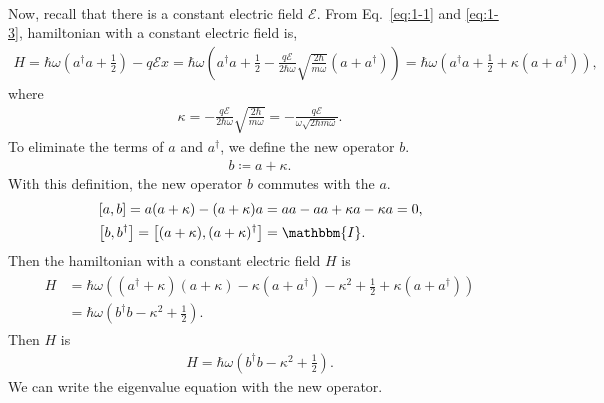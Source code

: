 \documentclass[floatfix,nofootinbib,superscriptaddress,fleqn]{revtex4-2}
\begin{document}
\begin{itemize}
\begin{align}
  \end{align}
  Now, recall that there is a constant 
  electric field $\mathcal{E}$. 
  From Eq.~\eqref{eq:1-1} and \eqref{eq:1-3}, 
  hamiltonian with a constant electric field is,
   \begin{align}\label{eq:1-4}
    H = \hbar\omega\left(a^\dagger a 
    + \frac{1}{2}\right)-q\mathcal{E}x
    = \hbar\omega\left(a^\dagger a 
    + \frac{1}{2}-\frac{q\mathcal{E}}{2\hbar\omega}
    \sqrt{\frac{2\hbar}{m\omega}}
    \left(a+a^\dagger\right)\right)
    =\hbar\omega\left(a^\dagger a 
    + \frac{1}{2}+\kappa\left(a+a^\dagger\right)\right),
   \end{align}  
   where
  \begin{align}\label{eq:1-8}
   \kappa = -\frac{q\mathcal{E}}{2\hbar\omega}
   \sqrt{\frac{2\hbar}{m\omega}}
   =-\frac{q\mathcal{E}}{\omega\sqrt{2\hbar m\omega}}.
  \end{align}
   To eliminate the terms of $a$ and $a^\dagger$, we define the new operator $b$.
   \begin{align}\label{eq:1-5}
    b \coloneqq a + \kappa.
   \end{align}
   With this definition, the new operator $b$ commutes with the $a$. 
   \begin{align}\label{eq:1-6}
    \begin{split}
      &\left[a,b\right] = a(a+\kappa)-(a+\kappa)a 
      = aa-aa+\kappa a-\kappa a=0, \\
      &\left[b,b^\dagger\right] 
      = \left[(a+\kappa),(a+\kappa)^\dagger\right] 
      = \mathbbm{I}.
    \end{split}
   \end{align}
   Then the hamiltonian with a constant electric field $H$ is
   \begin{align}\label{eq:1-7}
    \begin{split}
      H &= \hbar\omega\left((a^\dagger+\kappa)(a+\kappa)
      -\kappa(a+a^\dagger)-\kappa^2
      + \frac{1}{2}+\kappa\left(a+a^\dagger\right)\right)  \\
      &=\hbar\omega
      \left(
        b^\dagger b-\kappa^2
      + \frac{1}{2}
      \right).
    \end{split}
   \end{align}
   Then $H$ is
   \begin{align*}%
    H = \hbar\omega\left(b^\dagger b-\kappa^2
    + \frac{1}{2}\right).
   \end{align*}
    We can write the eigenvalue equation with the new operator.

\end{itemize}
\end{document}
